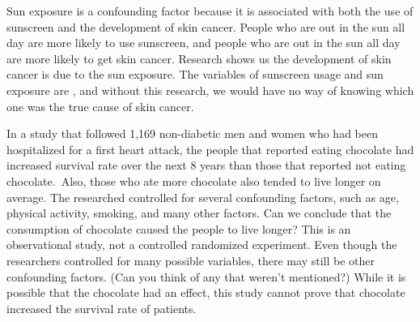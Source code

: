 Sun exposure is a confounding factor because it is associated with both the use of sunscreen and the development of skin cancer. People who are out in the sun all day are more likely to use sunscreen, and people who are out in the sun all day are more likely to get skin cancer. Research shows us the development of skin cancer is due to the sun exposure. The variables of sunscreen usage and sun exposure are , and without this research, we would have no way of knowing which one was the true cause of skin cancer.

\begin{examplewrap}
\begin{nexample}{In a study that followed 1,169 non-diabetic men and women who had been hospitalized for a first heart attack, the people that reported eating chocolate had increased survival rate over the next 8 years than those that reported not eating chocolate.\footnotemark\, Also, those who ate more chocolate also tended to live longer on average. The researched controlled for several confounding factors, such as age, physical activity, smoking, and many other factors. Can we conclude that the consumption of chocolate caused the people to live longer?} \label{confounding_2008_chocolate_health_study}
This is an observational study, not a controlled randomized experiment. Even though the researchers controlled for many possible variables, there may still be other confounding factors. (Can you think of any that weren't mentioned?) While it is possible that the chocolate had an effect, this study cannot prove that chocolate increased the survival rate of patients.
\end{nexample}
\end{examplewrap}


